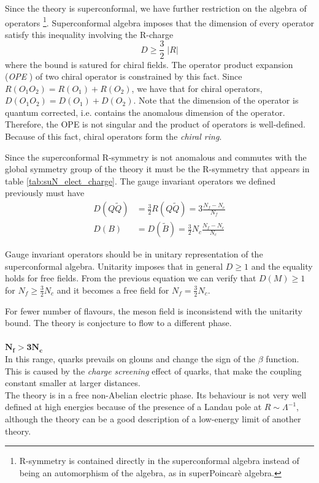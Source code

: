 Since the theory is superconformal, we have further restriction on the algebra of operators \footnote{
	R-symmetry is contained directly in the superconformal algebra instead of being an automorphism of the algebra, as in superPoincarè algebra.  
	}.
Superconformal algebra imposes that the dimension of every operator satisfy this inequality involving the R-charge
\begin{equation}
 D \geq \frac{3}{2} \; | R |
\end{equation}
where the bound is satured for chiral fields.
The operator product expansion (\emph{OPE} ) of two chiral operator is constrained by this fact.
Since $R( O_1 O_2) = R(O_1) + R(O_2)$, we have that for chiral operators, $D(O_1 O_2) = D(O_1) + D(O_2)$. 
Note that the dimension of the operator is quantum corrected, i.e. contains the anomalous dimension of the operator.
Therefore, the OPE is not singular and the product of operators is well-defined. Because of this fact, chiral operators form the \emph{chiral ring}. 

Since the superconformal R-symmetry is not anomalous and commutes with the global symmetry group of the theory it must be the R-symmetry that appears in table \ref{tab:suN_elect_charge}.
The gauge invariant operators we defined previously must have
\begin{align}
 D(Q \tilde{Q}) &= \frac{3}{2} R(Q \tilde{Q}) = 3 \frac{N_f - N_c}{N_f}\\
 D(B) & = D(\tilde{B})  = \frac{3}{2} N_c \frac{N_f - N_c}{N_c}
\end{align}

Gauge invariant operators should be in unitary representation of the superconformal algebra.
Unitarity imposes that in general $D\geq 1$ and the equality holds for free fields.
From the previous equation we can verify that $D(M) \geq 1$ for $ N_f \geq \frac{3}{2}N_c$ and it becomes a free field for $N_f = \frac{3}{2}N_c$. 

For fewer number of flavours, the meson field is inconsistend with the unitarity bound.
The theory is conjecture to flow to a different phase.
\\
\\
$\mathbf{ N_f > 3 N_c}$\\
In this range, quarks prevails on glouns and change the sign of the $\beta$ function. 
This is caused by the \emph{charge screening} effect of quarks, that make the coupling constant smaller at larger distances.\\
The theory is in a free non-Abelian electric phase.
Its behaviour is not very well defined at high energies because of the presence of a Landau pole at $R \sim \Lambda^{-1}$, although the theory can be a good description of a low-energy limit of another theory. 

